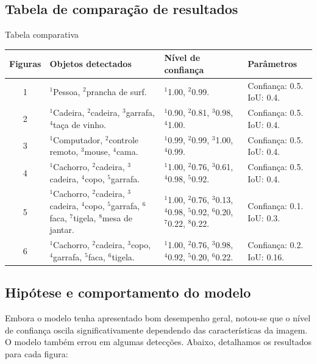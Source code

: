\documentclass[conference]{IEEEtran}
\begin{document}
\subsection{Tabela de comparação de resultados}\label{AA}
Tabela comparativa
\renewcommand{\tabularxcolumn}[1]{m{#1}}
\begin{table}[h]
\centering
\footnotesize 
\begin{tabularx}{\columnwidth}{|c|Y|Y|Y|}
\hline
\textbf{Figuras}& \textbf{Objetos detectados} &\textbf{Nível de confiança} &\textbf{Parâmetros}\\
 & $^{1}$Pessoa, $^{2}$prancha de surf. & $^{1}$1.00, $^{2}$0.99. & Confiança: 0.5. IoU: 0.4. \\  & $^{1}$Cadeira, $^{2}$cadeira, $^{3}$garrafa, $^{4}$taça de vinho. & $^{1}$0.90, $^{2}$0.81, $^{3}$0.98, $^{4}$1.00. & Confiança: 0.5. IoU: 0.4. \\  & $^{1}$Computador, $^{2}$controle remoto, $^{3}$mouse, $^{4}$cama. & $^{1}$0.99, $^{2}$0.99, $^{3}$1.00, $^{4}$0.99. & Confiança: 0.5. IoU: 0.4. \\  & $^{1}$Cachorro, $^{2}$cadeira, $^{3}$cadeira, $^{4}$copo, $^{5}$garrafa. & $^{1}$1.00, $^{2}$0.76, $^{3}$0.61, $^{4}$0.98, $^{5}$0.92. & Confiança: 0.5. IoU: 0.4. \\  & $^{1}$Cachorro, $^{2}$cadeira, $^{3}$cadeira, $^{4}$copo, $^{5}$garrafa, $^{6}$faca, $^{7}$tigela, $^{8}$mesa de jantar. & $^{1}$1.00, $^{2}$0.76, $^{3}$0.13, $^{4}$0.98, $^{5}$0.92, $^{6}$0.20, $^{7}$0.22, $^{8}$0.22. & Confiança: 0.1. IoU: 0.3. \\  & $^{1}$Cachorro, $^{2}$cadeira, $^{3}$copo, $^{4}$garrafa, $^{5}$faca, $^{6}$tigela. & $^{1}$1.00, $^{2}$0.76, $^{3}$0.98, $^{4}$0.92, $^{5}$0.20, $^{6}$0.22. & Confiança: 0.2. IoU: 0.16. \\ \hline
\end{tabularx}
\end{table}

\subsection{Hipótese e comportamento do modelo}\label{AA}
Embora o modelo tenha apresentado bom desempenho geral, notou-se que o nível de confiança oscila significativamente dependendo das características da imagem. O modelo também errou em algumas detecções. Abaixo, detalhamos os resultados para cada figura:
\end{document}
